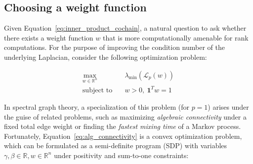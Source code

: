 \documentclass[pdflatex,sn-mathphys-num]{sn-jnl}
\begin{document}
\begin{appendices}
%

\subsection{\texorpdfstring{Choosing a weight function }{Choosing a weight function }}
Given Equation~\ref{eq:inner_product_cochain}, a natural question to ask whether there exists a weight function \(w\) that is more computationally amenable for rank computations. 
For the purpose of improving the condition number of the underlying Laplacian, consider the following optimization problem:

\[\begin{aligned}
\max\limits_{w \in \mathbb{R}^{n}} & \quad \lambda_{\min}\left( \mathcal{L}_{p}(w) \right) \\
\text{subject to} & \quad w > 0,\:\mathbf{1}^{T}w = 1
\end{aligned}\] \label{eq:alg_connectivity}{}

\noindent In spectral graph theory, a specialization of this problem (for \(p = 1\)) arises under the guise of related problems, such as maximizing \emph{algebraic connectivity} under a fixed total edge weight or finding the \emph{fastest mixing time} of a Markov process. Fortunately, Equation~\ref{eq:alg_connectivity} is a convex optimization problem, which can be formulated as a semi-definite program (SDP) with variables \(\gamma,\beta \in \mathbb{R},w \in \mathbb{R}^{n}\) under positivity and sum-to-one constraints:


\end{appendices}
\end{document}
